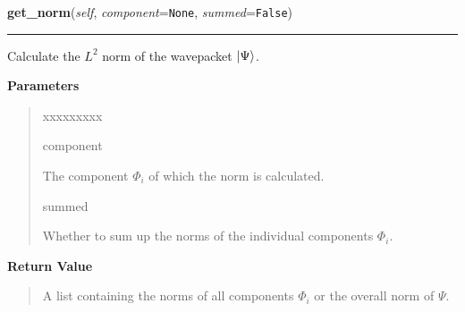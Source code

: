 \hspace{.8\funcindent}\begin{boxedminipage}{\funcwidth}

    \raggedright \textbf{get\_norm}(\textit{self}, \textit{component}={\tt None}, \textit{summed}={\tt False})

    \vspace{-1.5ex}

    \rule{\textwidth}{0.5\fboxrule}
\setlength{\parskip}{2ex}
    Calculate the $L^2$ norm of the wavepacket
    $\Ket{\Psi}$.

\setlength{\parskip}{1ex}
      \textbf{Parameters}
      \vspace{-1ex}

      \begin{quote}
        \begin{Ventry}{xxxxxxxxx}

          \item[component]

          The component $\Phi_i$ of which the norm is
          calculated.

          \item[summed]

          Whether to sum up the norms of the individual components
          $\Phi_i$.

        \end{Ventry}

      \end{quote}

      \textbf{Return Value}
    \vspace{-1ex}

      \begin{quote}
      A list containing the norms of all components
      $\Phi_i$ or the overall norm of
      $\Psi$.

      \end{quote}

    \end{boxedminipage}

    \label{HagedornWavepacket:HagedornWavepacket:potential_energy}

    \vspace{0.5ex}


